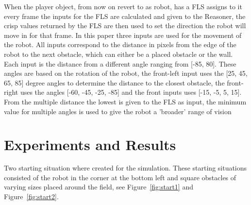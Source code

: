 \documentclass[conference]{IEEEtran}
\begin{document}
When the player object, from now on revert to as robot, has a FLS assigns to it every frame the inputs for the FLS are calculated and given to the Reasoner, the crisp values returned by the FLS are then used to set the direction the robot will move in for that frame. In this paper three inputs are used for the movement of the robot. All inputs correspond to the distance in pixels from the edge of the robot to the next obstacle, which can either be a placed obstacle or the wall. Each input is the distance from a different angle ranging from [-85, 80]. These angles are based on the rotation of the robot, the front-left input uses the [25, 45, 65, 85] degree angles to determine the distance to the closest obstacle, the front-right uses the angles [-60, -45, -25, -85] and the front inputs uses [-15, -5, 5, 15]. From the multiple distance the lowest is given to the FLS as input, the minimum value for multiple angles is used to give the robot a 'broader' range of vision %

\section{Experiments and Results}
Two starting situation where created for the simulation. These starting situations consisted of the robot in the corner at the bottom left and square obstacles of varying sizes placed around the field, see Figure~\ref{fig:start1} and Figure~\ref{fig:start2}.
\end{document}
